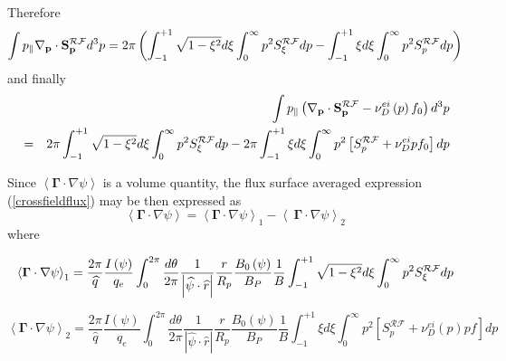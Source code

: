 Therefore
\begin{equation}
\int p_{\Vert }\mathbf{\nabla }_{\mathbf{p}}\cdot \mathbf{S}_{\mathbf{p}}^{%
\mathcal{RF}}d^{3}p=2\pi \left( \int_{-1}^{+1}\sqrt{1-\xi ^{2}}d\xi
\int_{0}^{\infty }p^{2}S_{\xi }^{\mathcal{RF}}dp-\int_{-1}^{+1}\xi d\xi
\int_{0}^{\infty }p^{2}S_{p}^{\mathcal{RF}}dp\right)
\end{equation}
and finally
\begin{eqnarray}
&&\int p_{\Vert }\left( \mathbf{\nabla }_{\mathbf{p}}\cdot \mathbf{S}_{%
\mathbf{p}}^{\mathcal{RF}}-\nu _{D}^{ei}\left( p\right) f_{0}\right) d^{3}p
\nonumber \\
&=&2\pi \int_{-1}^{+1}\sqrt{1-\xi ^{2}}d\xi \int_{0}^{\infty }p^{2}S_{\xi }^{%
\mathcal{RF}}dp-2\pi \int_{-1}^{+1}\xi d\xi \int_{0}^{\infty }p^{2}\left[
S_{p}^{\mathcal{RF}}+\nu _{D}^{ei}pf_{0}\right] dp
\end{eqnarray}

Since $\left\langle \mathbf{\Gamma }\cdot \nabla \psi \right\rangle $ is a
volume quantity, the flux surface averaged expression (\ref{crossfieldflux})
may be then expressed as
\begin{equation}
\left\langle \mathbf{\Gamma }\cdot \nabla \psi \right\rangle =\left\langle
\mathbf{\Gamma }\cdot \nabla \psi \right\rangle _{1}-\left\langle \mathbf{\
\Gamma }\cdot \nabla \psi \right\rangle _{2}
\end{equation}
where

\begin{equation}
\left\langle \mathbf{\Gamma }\cdot \nabla \psi \right\rangle _{1}=\frac{2\pi
}{\widehat{q}}\frac{I\left( \psi \right) }{q_{e}}\int_{0}^{2\pi }\frac{
d\theta }{2\pi }\frac{1}{\left| \widehat{\psi }\cdot \widehat{r}\right| }%
\frac{r}{R_{p}}\frac{B_{0}\left( \psi \right) }{B_{P}}\frac{1}{B}
\int_{-1}^{+1}\sqrt{1-\xi ^{2}}d\xi \int_{0}^{\infty }p^{2}S_{\xi }^{%
\mathcal{RF}}dp
\end{equation}

\begin{equation}
\left\langle \mathbf{\Gamma }\cdot \nabla \psi \right\rangle _{2}=\frac{2\pi
}{\widehat{q}}\frac{I\left( \psi \right) }{q_{e}}\int_{0}^{2\pi }\frac{
d\theta }{2\pi }\frac{1}{\left| \widehat{\psi }\cdot \widehat{r}\right| }%
\frac{r}{R_{p}}\frac{B_{0}\left( \psi \right) }{B_{P}}\frac{1}{B}
\int_{-1}^{+1}\xi d\xi \int_{0}^{\infty }p^{2}\left[ S_{p}^{\mathcal{RF}
}+\nu _{D}^{ei}\left( p\right) pf\right] dp
\end{equation}


